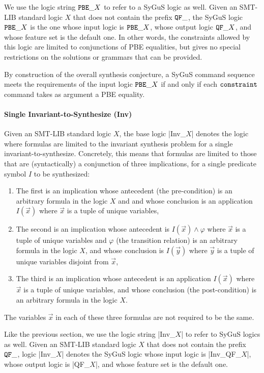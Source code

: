 \documentclass[english,a4paper,10pt]{article}
\begin{document}
We use the logic string ${\tt PBE\_}X$ to refer to a SyGuS logic as well.
Given an SMT-LIB standard logic $X$
that does not contain the prefix ${\tt QF\_}$,
the SyGuS logic ${\tt PBE\_}X$ is the one
whose input logic is ${\tt PBE\_}X$,
whose output logic ${\tt QF\_}X$,
and whose feature set is the default one.
In other words, the constraints allowed by this logic
are limited to conjunctions of PBE equalities,
but gives no special restrictions
on the solutions or grammars that can be provided.

By construction of the overall synthesis conjecture, a SyGuS command sequence
meets the requirements of the input logic ${\tt PBE\_}X$
if and only if each ${\tt constraint}$ command takes as argument a PBE equality.

\paragraph{Single Invariant-to-Synthesize (Inv)}
Given an SMT-LIB standard logic $X$,
the base logic \code|Inv_$X$| denotes the logic
where formulas are limited to the invariant synthesis
problem for a single invariant-to-synthesize.
Concretely,
this means that formulas are limited to those that 
are (syntactically) a conjunction of three implications, 
for a single predicate symbol $I$ to be synthesized:
\begin{enumerate}
\item The first is an implication whose antecedent (the pre-condition) 
is an arbitrary formula
in the logic $X$ and
and whose conclusion is
an application $I( \vec x )$ where $\vec x$ is a tuple of unique variables,

\item The second is an implication whose antecedent is
$I( \vec x ) \wedge \varphi$
where $\vec x$ is a tuple of unique variables and $\varphi$ (the transition relation) 
is an arbitrary formula
in the logic $X$,
and whose conclusion is $I( \vec y )$
where $\vec y$ is a tuple of unique variables disjoint from $\vec x$,

\item The third is an implication whose antecedent is 
an application $I( \vec x )$ where $\vec x$ is a tuple of unique variables,
and whose conclusion (the post-condition) is an arbitrary formula in the logic $X$.
\end{enumerate}
The variables $\vec x$ in each of these three formulas are not required to be the same.

Like the previous section, 
we use the logic string \code|Inv_$X$| to refer to SyGuS logics as well.
Given an SMT-LIB standard logic $X$
that does not contain the prefix ${\tt QF\_}$,
logic \code|Inv_$X$| denotes the SyGuS logic
whose input logic is \code|Inv_QF_$X$|,
whose output logic is \code|QF_$X$|,
and whose feature set is the default one.
\end{document}
